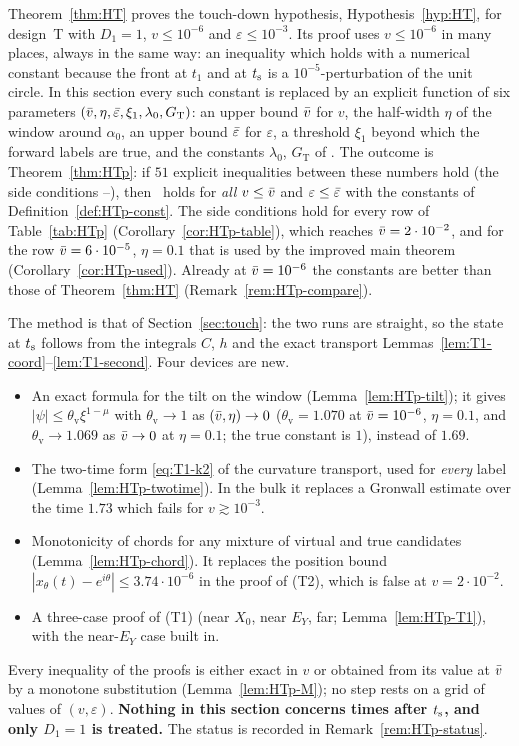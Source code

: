 Theorem~\ref{thm:HT} proves the touch-down hypothesis, Hypothesis~\ref{hyp:HT}, for design~T with $D_1=1$, $v\le10^{-6}$ and
$\varepsilon\le10^{-3}$. Its proof uses $v\le10^{-6}$ in many places, always in the same way: an inequality which holds with a
numerical constant because the front at $t_1$ and at $t_{\mathrm s}$ is a $10^{-5}$-perturbation of the unit circle. In this section every such
constant is replaced by an explicit function of six parameters $(\bar v,\eta,\bar\varepsilon,\xi_1,\lambda_0,G_{\mathrm T})$: an upper bound
$\bar v$ for $v$, the half-width $\eta$ of the window around $\alpha_0$, an upper bound $\bar\varepsilon$ for $\varepsilon$, a threshold $\xi_1$ beyond
which the forward labels are true, and the constants $\lambda_0$, $G_{\mathrm T}$ of \MHT. The outcome is
Theorem~\ref{thm:HTp}: if $51$ explicit inequalities between these numbers hold (the side conditions --), then
\MHT\ holds for \emph{all} $v\le\bar v$ and $\varepsilon\le\bar\varepsilon$ with the constants of Definition~\ref{def:HTp-const}. The side
conditions hold for every row of Table~\ref{tab:HTp} (Corollary~\ref{cor:HTp-table}), which reaches $\bar v=2\cdot10^{-2}$, and for the
row $\bar v=6\cdot10^{-5}$, $\eta=0.1$ that is used by the improved main theorem (Corollary~\ref{cor:HTp-used}). Already at
$\bar v=10^{-6}$ the constants are better than those of Theorem~\ref{thm:HT} (Remark~\ref{rem:HTp-compare}).

The method is that of Section~\ref{sec:touch}: the two runs are straight, so the state at $t_{\mathrm s}$ follows from the integrals
$C$, $h$ and the exact transport Lemmas~\ref{lem:T1-coord}--\ref{lem:T1-second}. Four devices are new.
\begin{itemize}
\item An exact formula for the tilt on the window (Lemma~\ref{lem:HTp-tilt}); it gives $|\psi|\le\theta_{\mathrm v}\xi^{1-\mu}$ with
$\theta_{\mathrm v}\to1$ as $(\bar v,\eta)\to0$ ($\theta_{\mathrm v}=1.070$ at $\bar v=10^{-6}$, $\eta=0.1$, and
$\theta_{\mathrm v}\to1.069$ as $\bar v\to0$ at $\eta=0.1$; the true constant is $1$), instead of $1.69$.
\item The two-time form \eqref{eq:T1-k2} of the curvature transport, used for \emph{every} label (Lemma~\ref{lem:HTp-twotime}). In the
bulk it replaces a Gronwall estimate over the time $1.73$ which fails for $v\gtrsim10^{-3}$.
\item Monotonicity of chords for any mixture of virtual and true candidates (Lemma~\ref{lem:HTp-chord}). It replaces the position bound
$|x_\theta(t)-e^{i\theta}|\le3.74\cdot10^{-6}$ in the proof of \textup{(T2)}, which is false at $v=2\cdot10^{-2}$.
\item A three-case proof of \textup{(T1)} (near $X_0$, near $E_Y$, far; Lemma~\ref{lem:HTp-T1}), with the near-$E_Y$ case built in.
\end{itemize}
Every inequality of the proofs is either exact in $v$ or obtained from its value at $\bar v$ by a monotone substitution
(Lemma~\ref{lem:HTp-M}); no step rests on a grid of values of $(v,\varepsilon)$. \textbf{Nothing in this section concerns times after
$t_{\mathrm s}$, and only $D_1=1$ is treated.} The status is recorded in Remark~\ref{rem:HTp-status}.

